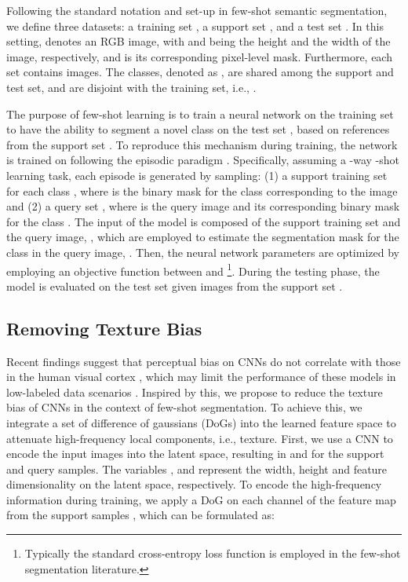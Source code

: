 \documentclass[runningheads]{llncs}
\begin{document}
Following the standard notation and set-up in few-shot semantic segmentation, we define three datasets: a training set , a support set , and a test set . In this setting,  denotes an RGB image, with  and  being the height and the width of the image, respectively, and  is its corresponding pixel-level mask. Furthermore, each set contains  images. The classes, denoted as , are shared among the support and test set, and are disjoint with the training set, i.e.,  . 

The purpose of few-shot learning is to train a neural network  on the training set  to have the ability to segment a novel class  on the test set , based on  references from the support set . To reproduce this mechanism during training, the network is trained on  following the episodic paradigm \cite{vinyals2016matching}. Specifically, assuming a -way -shot learning task, each episode is generated by sampling: (1) a support training set  for each class , where  is the binary mask for the class  corresponding to the image  and (2) a query set , where  is the query image and  its corresponding binary mask for the class . The input of the model is composed of the support training set and the query image, , which are employed to estimate the segmentation mask for the class  in the query image, . Then, the neural network parameters  are optimized by employing an objective function between  and \footnote{Typically the standard cross-entropy loss function is employed in the few-shot segmentation literature.}. During the testing phase, the model  is evaluated on the test set  given  images from the support set .

\subsection{Removing Texture Bias}



Recent findings suggest that perceptual bias on CNNs do not correlate with those in the human visual cortex \cite{geirhos2018imagenet}, which may limit the performance of these models in low-labeled data scenarios \cite{ringer2019texture}. Inspired by this, we propose to reduce the texture bias of CNNs in the context of few-shot segmentation. To achieve this, we integrate a set of difference of gaussians (DoGs) \cite{lowe2004distinctive} into the learned feature space to attenuate high-frequency local components, i.e., texture. First, we use a CNN to encode the input images into the latent space, resulting in  and  for the support and query samples. The variables ,  and  represent the width, height and feature dimensionality on the latent space, respectively. To encode the high-frequency information during training, we apply a DoG on each channel  of the feature map from the support samples , which can be formulated as:
\end{document}
